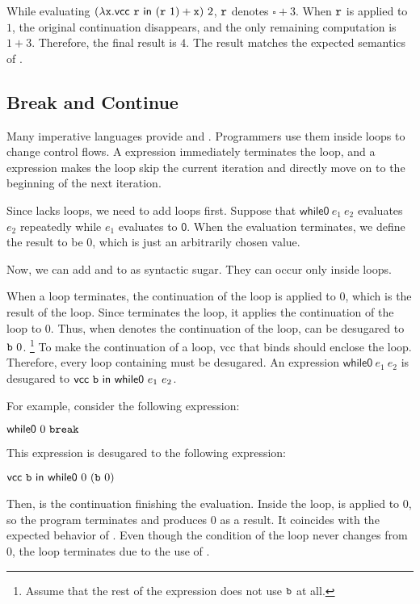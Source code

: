 While evaluating $(\lambda \texttt{x}.\textsf{vcc}\ \texttt{r}\ \textsf{in}\ (\texttt{r}\ 1)+\texttt{x})\ 2$,
$\texttt{r}$ denotes $\square+3$. When $\texttt{r}$ is applied to $1$,
the original continuation disappears, and the only remaining computation is
$1+3$. Therefore, the final result is $4$. The result matches the expected
semantics of .

\subsection{Break and Continue}

Many imperative languages provide  and . Programmers
use them inside loops to change control flows. A  expression
immediately terminates the loop, and a  expression makes the
loop skip the current iteration and directly move on to the beginning of the
next iteration.

Since \Lang lacks loops, we need to add loops first.
Suppose that $\textsf{while0}\ e_1\ e_2$ evaluates $e_2$ repeatedly while $e_1$
evaluates to $\textsf{0}$. When the evaluation terminates, we define the result
to be $0$, which is just an arbitrarily chosen value.

Now, we can add  and  to \Lang as syntactic
sugar. They can occur only inside loops.

When a loop terminates, the continuation of the loop is applied to $0$, which is
the result of the loop. Since  terminates the loop, it
applies the continuation of the loop to $0$. Thus, when  denotes the
continuation of the loop,  can be desugared to $\texttt{b}\ 0$.
\footnote{Assume that the rest of the expression does not use $\texttt{b}$ at all.}
To make  the continuation of a loop, \textsf{vcc} that binds 
should enclose the loop. Therefore, every loop containing  must be
desugared. An expression $\textsf{while0}\ e_1\ e_2$ is desugared to
$\evcc{\code{b}}{\textsf{while0}\ e_1\ e_2}$.

For example, consider the following expression:

$\textsf{while0}\ 0\ \code{break}$

This expression is desugared to the following expression:

$\evcc{\code{b}}{\textsf{while0}\ 0\ (\code{b}\ 0)}$

Then,  is the continuation finishing the evaluation.
Inside the loop,  is applied to $0$, so the program terminates and
produces $0$ as a result. It coincides with the expected behavior of .
Even though the condition of the loop never changes from $0$, the loop
terminates due to the use of .

